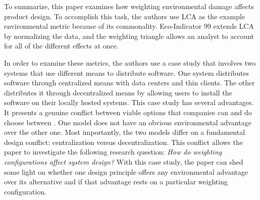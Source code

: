 \documentclass[final,journal,10pt,letterpaper,oneside,twocolumn,compsoc]%
{IEEEtran}
\begin{document}
To summarize, this paper examines how weighting environmental damage affects
product design. To accomplish this task, the authors use LCA
as the example environmental metric because of its commonality. Eco-Indicator 99
extends LCA by normalizing the data, and the weighting triangle allows an
analyst to account for all of the different effects at once.

In order to examine these metrics, the authors use a case study that involves
two systems that use different means to distribute software. One system
distributes software through centralized means with data centers and thin
clients. The other distributes it through decentralized means by allowing users
to install the software on their locally hosted systems. This case study has
several advantages. It presents a genuine conflict between viable options that
companies can and do choose between \cite{maga}. One model does not have an
obvious environmental advantage over the other one. Most importantly, the two
models differ on a fundamental design conflict: centralization versus
decentralization. This conflict allows the paper to investigate the following
research question: \textit{How do weighting configurations affect system design?} With
this case study, the paper can shed some light on whether one design principle
offers any environmental advantage over its alternative and if that advantage
rests on a particular weighting configuration.




\end{document}

